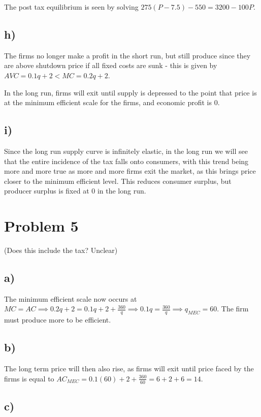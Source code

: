 \documentclass[12pt,letterpaper]{article}
\theoremstyle{definition}
\begin{document}
The post tax equilibrium is seen by solving $275(P - 7.5) - 550 = 3200 - 100P$.

\subsection*{h)}

The firms no longer make a profit in the short run, but still produce since they
are above shutdown price if all fixed costs are sunk - this is given by $AVC =
0.1q + 2 < MC = 0.2q + 2$.

In the long run, firms will exit until supply is depressed to the point that
price is at the minimum efficient scale for the firms, and economic profit is 0.

\subsection*{i)}

Since the long run supply curve is infinitely elastic, in the long run we will
see that the entire incidence of the tax falls onto consumers, with this trend
being more and more true as more and more firms exit the market, as this brings
price closer to the minimum efficient level. This reduces consumer surplus, but
producer surplus is fixed at 0 in the long run.

\section*{Problem 5}

(Does this include the tax? Unclear)

\subsection*{a)}

The minimum efficient scale now occurs at $MC = AC \implies 0.2q + 2 = 0.1q + 2
+ \frac{360}{q} \implies 0.1q = \frac{360}{q} \implies q_{MEC} = 60$. The firm must
produce more to be efficient.

\subsection*{b)}

The long term price will then also rise, as firms will exit until price faced by
the firms is equal to $AC_{MEC} = 0.1(60) + 2 + \frac{360}{60} = 6 + 2 + 6 = 14.$

\subsection*{c)}
\end{document}
